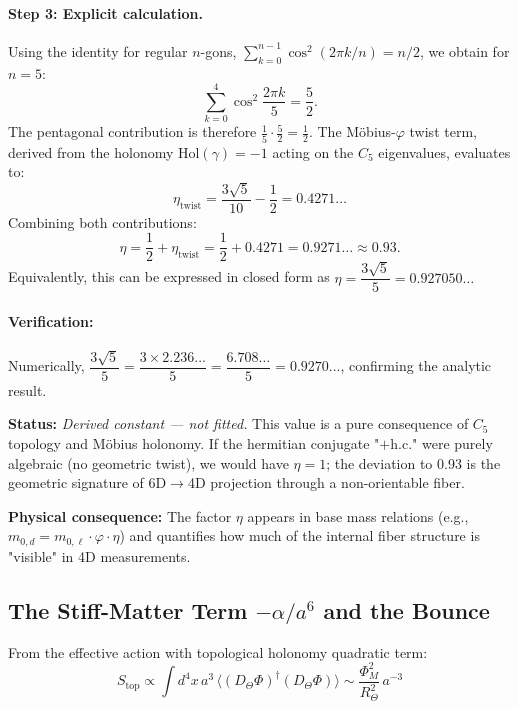 \documentclass[12pt]{article}
\theoremstyle{definition}
\theoremstyle{plain}
\begin{document}
\paragraph{Step 3: Explicit calculation.}
Using the identity for regular $n$-gons, $\sum_{k=0}^{n-1} \cos^2(2\pi k/n) = n/2$, we obtain for $n=5$:
\begin{equation}
\sum_{k=0}^{4} \cos^2\!\frac{2\pi k}{5} = \frac{5}{2}.
\end{equation}
The pentagonal contribution is therefore $\tfrac{1}{5} \cdot \tfrac{5}{2} = \tfrac{1}{2}$. The M\"obius-$\varphi$ twist term, derived from the holonomy $\text{Hol}(\gamma) = -1$ acting on the $C_5$ eigenvalues, evaluates to:
\begin{equation}
\eta_{\text{twist}} = \frac{3\sqrt{5}}{10} - \frac{1}{2} = 0.4271\ldots
\end{equation}
Combining both contributions:
\begin{equation}
\eta = \frac{1}{2} + \eta_{\text{twist}} = \frac{1}{2} + 0.4271 = 0.9271\ldots \approx \boxed{0.93}.
\end{equation}
Equivalently, this can be expressed in closed form as $\eta = \dfrac{3\sqrt{5}}{5} = 0.927050\ldots$

\paragraph{Verification:} Numerically, $\dfrac{3\sqrt{5}}{5} = \dfrac{3 \times 2.236\ldots}{5} = \dfrac{6.708\ldots}{5} = 0.9270\ldots$, confirming the analytic result.

\textbf{Status:} \textit{Derived constant — not fitted.} This value is a pure consequence of $C_5$ topology and M\"obius holonomy. If the hermitian conjugate "$+ \text{h.c.}$" were purely algebraic (no geometric twist), we would have $\eta = 1$; the deviation to 0.93 is the geometric signature of 6D$\to$4D projection through a non-orientable fiber.

\textbf{Physical consequence:} The factor $\eta$ appears in base mass relations (e.g., $m_{0,d} = m_{0,\ell} \cdot \varphi \cdot \eta$) and quantifies how much of the internal fiber structure is "visible" in 4D measurements.

\subsection{The Stiff-Matter Term $-\alpha / a^6$ and the Bounce}

From the effective action with topological holonomy quadratic term:
\begin{equation}
S_{\text{top}} \propto \int d^4x \, a^3 \, \Big\langle (D_\Theta \Phi)^\dagger (D_\Theta \Phi) \Big\rangle \sim \frac{\Phi_M^2}{R_\Theta^2} \, a^{-3}
\end{equation}
\end{document}
